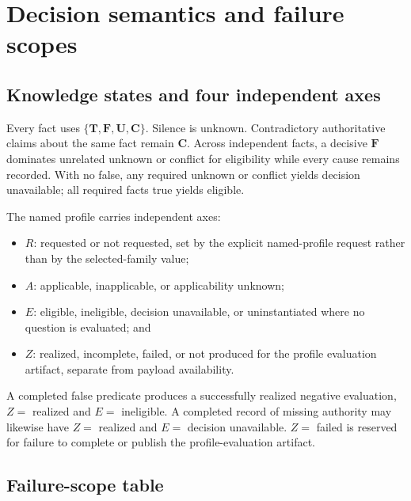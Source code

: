 \ifengineeringview

\section{Decision semantics and failure scopes}

\subsection{Knowledge states and four independent axes}

Every fact uses \(\{\mathbf T,\mathbf F,\mathbf U,\mathbf C\}\). Silence is
unknown. Contradictory authoritative claims about the same fact remain
\(\mathbf C\). Across independent facts, a decisive \(\mathbf F\) dominates
unrelated unknown or conflict for eligibility while every cause remains
recorded. With no false, any required unknown or conflict yields decision
unavailable; all required facts true yields eligible.

The named profile carries independent axes:

\begin{itemize}
\item \(R\): requested or not requested, set by the explicit named-profile
request rather than by the selected-family value;
\item \(A\): applicable, inapplicable, or applicability unknown;
\item \(E\): eligible, ineligible, decision unavailable, or uninstantiated
where no question is evaluated; and
\item \(Z\): realized, incomplete, failed, or not produced for the profile
evaluation artifact, separate from payload availability.
\end{itemize}

A completed false predicate produces a successfully realized negative
evaluation, \(Z=\) realized and \(E=\) ineligible. A completed record of
missing authority may likewise have \(Z=\) realized and \(E=\) decision
unavailable. \(Z=\) failed is reserved for failure to complete or publish the
profile-evaluation artifact.

\subsection{Failure-scope table}

